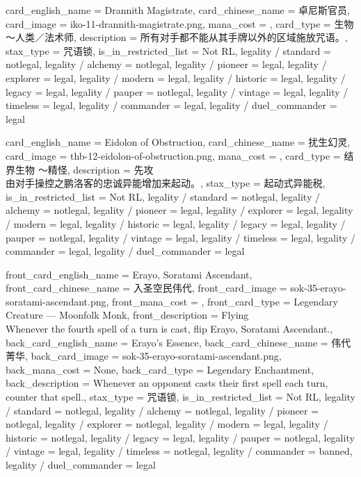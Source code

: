 \documentclass[lang = cn, color = black, 10pt]{AllThatStax}
\begin{document}
\card
{
	card_english_name = {Drannith Magistrate},
	card_chinese_name = {卓尼斯官员},
	card_image = iko-11-drannith-magistrate.png,
	mana_cost = ,
	card_type = 生物 ～人类／法术师,
	description = {所有对手都不能从其手牌以外的区域施放咒语。},
	stax_type = 咒语锁,
	is_in_restricted_list = Not RL,
	legality / standard = notlegal,
	legality / alchemy = notlegal,
	legality / pioneer = legal,
	legality / explorer = legal,
	legality / modern = legal,
	legality / historic = legal,
	legality / legacy = legal,
	legality / pauper = notlegal,
	legality / vintage = legal,
	legality / timeless = legal,
	legality / commander = legal,
	legality / duel_commander = legal
}

\card
{
	card_english_name = {Eidolon of Obstruction},
	card_chinese_name = {扰生幻灵},
	card_image = thb-12-eidolon-of-obstruction.png,
	mana_cost = ,
	card_type = 结界生物 ～精怪,
	description = {先攻\\
		由对手操控之鹏洛客的忠诚异能增加来起动。},
	stax_type = 起动式异能税,
	is_in_restricted_list = Not RL,
	legality / standard = notlegal,
	legality / alchemy = notlegal,
	legality / pioneer = legal,
	legality / explorer = legal,
	legality / modern = legal,
	legality / historic = legal,
	legality / legacy = legal,
	legality / pauper = notlegal,
	legality / vintage = legal,
	legality / timeless = legal,
	legality / commander = legal,
	legality / duel_commander = legal
}

\mfcard
{
	front_card_english_name = {Erayo, Soratami Ascendant},
	front_card_chinese_name = {入圣空民伟代},
	front_card_image = sok-35-erayo-soratami-ascendant.png,
	front_mana_cost = ,
	front_card_type = Legendary Creature — Moonfolk Monk,
	front_description = {Flying\\
		Whenever the fourth spell of a turn is cast, flip Erayo, Soratami Ascendant.},
	back_card_english_name = {Erayo's Essence},
	back_card_chinese_name = {伟代菁华},
	back_card_image = sok-35-erayo-soratami-ascendant.png,
	back_mana_cost = None,
	back_card_type = Legendary Enchantment,
	back_description = {Whenever an opponent casts their first spell each turn, counter that spell.},
	stax_type = 咒语锁,
	is_in_restricted_list = Not RL,
	legality / standard = notlegal,
	legality / alchemy = notlegal,
	legality / pioneer = notlegal,
	legality / explorer = notlegal,
	legality / modern = legal,
	legality / historic = notlegal,
	legality / legacy = legal,
	legality / pauper = notlegal,
	legality / vintage = legal,
	legality / timeless = notlegal,
	legality / commander = banned,
	legality / duel_commander = legal
}
\end{document}
